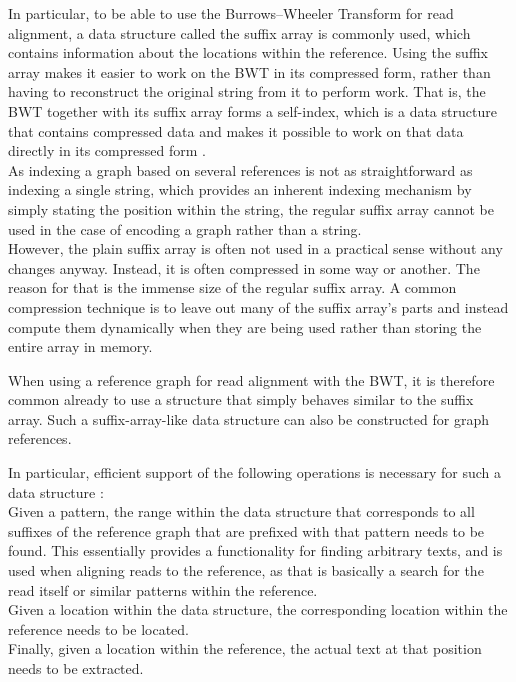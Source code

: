 \documentclass[a4paper,12pt,twoside,BCOR=10mm]{scrbook}
\begin{document}
In particular, to be able to use the Burrows--Wheeler Transform for read alignment,
a data structure called the suffix array \citep{Puglisi2007} is commonly used, which contains
information about the locations within the reference.
Using the suffix array makes it easier to work on the BWT in its compressed form,
rather than having to reconstruct the original string from it to perform work.
That is, the BWT together with its suffix array forms a self-index,
which is a data structure that contains compressed data and makes it possible
to work on that data directly in its compressed form \citep{Navarro2007}. \\
As indexing a graph based on several references is not as straightforward as
indexing a single string, which provides an inherent indexing mechanism by
simply stating the position within the string, the regular suffix array cannot
be used in the case of encoding a graph rather than a string. \\
However, the plain suffix array is often not used in a practical sense
without any changes anyway. Instead, it is often compressed in some way or another.
The reason for that is the immense size of the regular suffix array.
A common compression technique is to leave out many of the suffix array's parts
and instead compute them dynamically
when they are being used rather than storing the entire array in memory.

When using a reference graph for read alignment with the BWT, it is therefore common
already to use a structure that simply behaves similar to the suffix array.
Such a suffix-array-like data structure can also be constructed for graph references.

In particular, efficient support of the following operations is necessary for such a data structure \citep{Siren2014}: \\
Given a pattern, the range within the data structure
that corresponds to all suffixes of the reference graph that are prefixed with that pattern needs to be found.
This essentially provides a functionality for finding arbitrary texts, and is used when aligning reads to
the reference, as that is basically a search for the read itself or similar patterns within the reference. \\
Given a location within the data structure, the corresponding location within the
reference needs to be located. \\
Finally, given a location within the reference, the actual text at that position
needs to be extracted.
\end{document}
